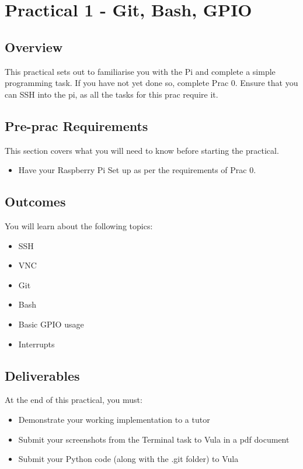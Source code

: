 \section{Practical 1 - Git, Bash, GPIO}
\label{sec:Prac1}
\subsection{Overview}
This practical sets out to familiarise you with the Pi and complete a simple programming task. If you have not yet done so, complete Prac 0. Ensure that you can SSH into the pi, as all the tasks for this prac require it.

\subsection{Pre-prac Requirements}
This section covers what you will need to know before starting the practical.
\begin{itemize}
    \item Have your Raspberry Pi Set up as per the requirements of Prac 0.
\end{itemize}

\subsection{Outcomes}
You will learn about the following topics:
\begin{itemize}
    \item SSH
    \item VNC
    \item Git
    \item Bash
    \item Basic GPIO usage
    \item Interrupts
\end{itemize}

\subsection{Deliverables}
At the end of this practical, you must:
\begin{itemize}
    \item Demonstrate your working implementation to a tutor
    \item Submit your screenshots from the Terminal task to Vula in a pdf document
    \item Submit your Python code (along with the .git folder) to Vula
\end{itemize}


